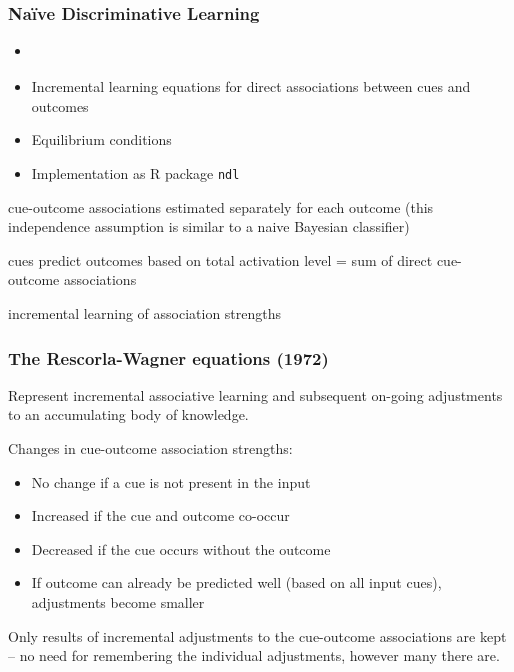 \documentclass[t]{beamer} %
\begin{document}
\begin{frame}
  \frametitle{Naïve Discriminative Learning}
  
  \begin{itemize}
  \item \citet{Baayen:11,Baayen:etc:11}
  \item Incremental learning equations for direct associations between cues and outcomes \citep{Rescorla:Wagner:72} 
  \item Equilibrium conditions \citep{Danks:03}
  \item Implementation as R package \texttt{ndl} \citep{Arppe:etc:14}
  \end{itemize}
  
  \gap[1]
  \begin{description}[Discriminative:]
   \item[Naive:] cue-outcome associations estimated separately for
    each outcome (this independence assumption is similar to
    a naive Bayesian classifier)
  \item[Discriminative:] cues predict outcomes based on total activation level
    = sum of direct cue-outcome associations
  \item[Learning:] incremental learning of association strengths
  \end{description}
\end{frame}

\begin{frame}
  \frametitle{The Rescorla-Wagner equations (1972)}

  Represent incremental associative learning and subsequent on-going
  adjustments to an accumulating body of knowledge.

  \gap[1]
  Changes in cue-outcome association strengths:
  \begin{itemize}
  \item No change if a cue is not present in the input
  \item Increased if the cue and outcome co-occur
  \item Decreased if the cue occurs without the outcome
  \item If outcome can already be predicted well (based on all input cues),
    adjustments become smaller
  \end{itemize}

  \gap[1] 
  Only results of incremental adjustments to the cue-outcome associations are
  kept -- no need for remembering the individual adjustments, however many
  there are.
\end{frame}
\end{document}
